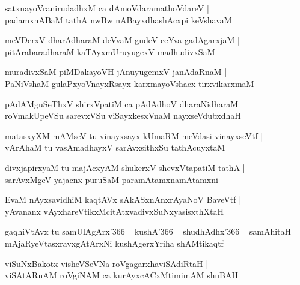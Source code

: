 \documentclass[twoside,12pt,openright]{book}
\newcounter{shloka}[chapter]
\begin{document}
\begin{shloka}%
satxnayoVranirudadhxM ca dAmoVdaramathoVdareV |\\
padamxnABaM tathA nwBw nABayxdhashAcxpi keVshavaM
\end{shloka}

\begin{shloka}%
meVDerxV dharAdharaM deVvaM gudeV ceYva gadAgarxjaM |\\
pitArabaradharaM kaTAyxmUruyugexV madhudivxSaM 
\end{shloka}

\begin{shloka}%
muradivxSaM piMDakayoVH jAnuyugemxV janAdaRnaM |\\
PaNiVshaM gulaPxyoVnayxRsayx karxmayoVshacx tirxvikarxmaM 
\end{shloka}

\begin{shloka}%
pAdAMguSeThxV shirxVpatiM ca pAdAdhoV dharaNidharaM |\\
roVmakUpeVSu sarevxVSu viSayxkesxVnaM nayxseVdubxdhaH 
\end{shloka}

\begin{shloka}%
matasxyXM mAMseV tu vinayxsayx kUmaRM meVdasi vinayxseVtf |\\
vArAhaM tu vasAmadhayxV sarAvxsithxSu tathAcuyxtaM 
\end{shloka}

\begin{shloka}%
divxjapirxyaM tu majAcxyAM shukerxV shevxVtapatiM tathA |\\
sarAvxMgeV yajacnx puruSaM paramAtamxnamAtamxni
\end{shloka}

\begin{shloka}%
EvaM nAyxsavidhiM kaqtAVx sAkASxnAnxrAyaNoV BaveVtf |\\
yAvananx vAyxhareVtikxMcitAtxvadivxSuNxyasisxthXtaH
\end{shloka}

\begin{shloka}%
gaqhiVtAvx tu samUlAgArx\char'366 ~ kushA\char'366 ~ shudhAdhx\char'366 ~ samAhitaH |\\
mAjaRyeVtasxravxgAtArxNi kushAgerxYriha shAMtikaqtf
\end{shloka}

\begin{shloka}%
viSuNxBakotx visheVSeVNa roVgagarxhaviSAdiRtaH |\\
viSAtARnAM roVgiNAM ca kurAyxcACxMtimimAM shuBAH 
\end{shloka}
\end{document}
